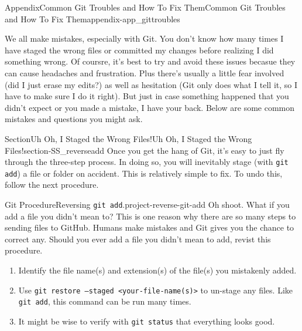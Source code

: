 \documentclass[oneside,10pt,]{book}
\newcommand{\mono}[1]{\texttt{#1}}
\begin{document}
\begin{appendixptx}{Appendix}{Common Git Troubles and How To Fix Them}{}{Common Git Troubles and How To Fix Them}{}{}{appendix-app_gittroubles}
\renewcommand*{\appendixname}{Appendix}
%
\begin{introduction}{}%
We all make mistakes, especially with Git. You don't know how many times I have staged the wrong files or committed my changes before realizing I did something wrong. Of coursre, it's best to try and avoid these issues becasue they can cause headaches and frustration. Plus there's usually a little fear involved (did I just erase my edits?) as well as hesitation (Git only does what I tell it, so I have to make sure I do it right). But just in case something happened that you didn't expect or you made a mistake, I have your back. Below are some common mistakes and questions you might ask.%
\end{introduction}%
%
%
\typeout{************************************************}
\typeout{************************************************}
%
\begin{sectionptx}{Section}{Uh Oh, I Staged the Wrong Files!}{}{Uh Oh, I Staged the Wrong Files!}{}{}{section-SS_reverseadd}
%
%
Once you get the hang of Git, it's easy to just fly through the three-step process. In doing so, you will inevitably stage (with \mono{git add}) a file or folder on accident. This is relatively simple to fix. To undo this, follow the next procedure.%
\begin{project}{Git Procedure}{Reversing \mono{git add}.}{project-reverse-git-add}%
Oh shoot. What if you add a file you didn't mean to? This is one reason why there are so many steps to sending files to GitHub. Humans make mistakes and Git gives you the chance to correct any. Should you ever add a file you didn't mean to add, revist this procedure.%
\begin{enumerate}[font=\bfseries,label=(\alph*),ref=\alph*]%
\item{}Identify the file name(s) and extension(s) of the file(s) you mistakenly added.%
\item{}Use \mono{git restore --staged <your-file-name(s)>} to un-stage any files. Like \mono{git add}, this command can be run many times.%
\item{}It might be wise to verify with \mono{git status} that everything looks good.%
\end{enumerate}%
\end{project}%

\end{sectionptx}
\end{appendixptx}
\end{document}
